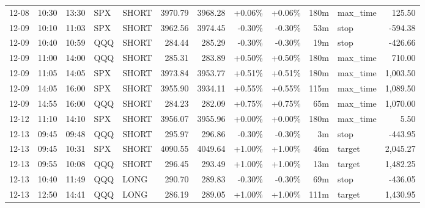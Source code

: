 \documentclass[11pt,a4paper,twoside]{article}
\begin{document}
\begin{center}
\begin{longtable}{>{\color{txtmain}}l l l l l r r r r r >{\color{txtmain}}l r}
12-08 & 10:30 & 13:30 & SPX & SHORT & 3970.79 & 3968.28 & \textcolor{wingreen}{+0.06\%} & \textcolor{wingreen}{+0.06\%} & 180m & max\_time & \textcolor{wingreen}{125.50} \\
12-09 & 10:10 & 11:03 & SPX & SHORT & 3962.56 & 3974.45 & \textcolor{lossred}{-0.30\%} & \textcolor{lossred}{-0.30\%} & 53m & stop & \textcolor{lossred}{-594.38} \\
12-09 & 10:40 & 10:59 & QQQ & SHORT & 284.44 & 285.29 & \textcolor{lossred}{-0.30\%} & \textcolor{lossred}{-0.30\%} & 19m & stop & \textcolor{lossred}{-426.66} \\
12-09 & 11:00 & 14:00 & QQQ & SHORT & 285.31 & 283.89 & \textcolor{wingreen}{+0.50\%} & \textcolor{wingreen}{+0.50\%} & 180m & max\_time & \textcolor{wingreen}{710.00} \\
12-09 & 11:05 & 14:05 & SPX & SHORT & 3973.84 & 3953.77 & \textcolor{wingreen}{+0.51\%} & \textcolor{wingreen}{+0.51\%} & 180m & max\_time & \textcolor{wingreen}{1,003.50} \\
12-09 & 14:05 & 16:00 & SPX & SHORT & 3955.90 & 3934.11 & \textcolor{wingreen}{+0.55\%} & \textcolor{wingreen}{+0.55\%} & 115m & max\_time & \textcolor{wingreen}{1,089.50} \\
12-09 & 14:55 & 16:00 & QQQ & SHORT & 284.23 & 282.09 & \textcolor{wingreen}{+0.75\%} & \textcolor{wingreen}{+0.75\%} & 65m & max\_time & \textcolor{wingreen}{1,070.00} \\
12-12 & 11:10 & 14:10 & SPX & SHORT & 3956.07 & 3955.96 & \textcolor{wingreen}{+0.00\%} & \textcolor{wingreen}{+0.00\%} & 180m & max\_time & \textcolor{wingreen}{5.50} \\
12-13 & 09:45 & 09:48 & QQQ & SHORT & 295.97 & 296.86 & \textcolor{lossred}{-0.30\%} & \textcolor{lossred}{-0.30\%} & 3m & stop & \textcolor{lossred}{-443.95} \\
12-13 & 09:45 & 10:31 & SPX & SHORT & 4090.55 & 4049.64 & \textcolor{wingreen}{+1.00\%} & \textcolor{wingreen}{+1.00\%} & 46m & target & \textcolor{wingreen}{2,045.27} \\
12-13 & 09:55 & 10:08 & QQQ & SHORT & 296.45 & 293.49 & \textcolor{wingreen}{+1.00\%} & \textcolor{wingreen}{+1.00\%} & 13m & target & \textcolor{wingreen}{1,482.25} \\
12-13 & 10:40 & 11:49 & QQQ & LONG & 290.70 & 289.83 & \textcolor{lossred}{-0.30\%} & \textcolor{lossred}{-0.30\%} & 69m & stop & \textcolor{lossred}{-436.05} \\
12-13 & 12:50 & 14:41 & QQQ & LONG & 286.19 & 289.05 & \textcolor{wingreen}{+1.00\%} & \textcolor{wingreen}{+1.00\%} & 111m & target & \textcolor{wingreen}{1,430.95} \\

\end{longtable}
\end{center}
\end{document}
